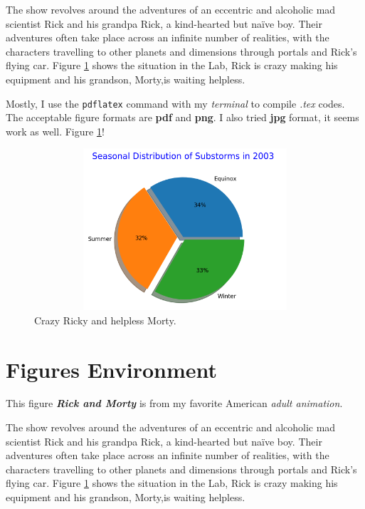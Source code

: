 \documentclass[12pt, letterpaper]{article} %
\begin{document}
The show revolves around the adventures of an eccentric and alcoholic mad scientist Rick and his grandpa Rick, 
a kind-hearted but naïve boy. Their adventures often take place across an infinite number of realities, with the 
characters travelling to other planets and dimensions through portals and Rick's flying car. Figure \ref{fig:rick} shows 
the situation in the Lab, Rick is crazy making his equipment and his grandson, Morty,is waiting helpless.

Mostly, I use the  {\tt pdflatex} command with my \textit{terminal} to compile \textit{.tex} codes. The acceptable figure 
formats are \textbf{pdf} and \textbf{png}. I also tried \textbf{jpg} format, it seems work as well. 
Figure \ref{fig:rick}! %
\begin{figure}[!t] %
\begin{center} %
  \includegraphics[width=12cm,height=6cm]{seasonal_distribution.png} %
  \caption{Crazy Ricky and helpless Morty.} %
  \label{fig:rick} %
\end{center} %
\end{figure} %


\section{Figures Environment} %
\graphicspath{ {./images/} } %
This figure \textit{\textbf{Rick and Morty }} is from my favorite American \textit{adult animation}.

The show revolves around the adventures of an eccentric and alcoholic mad scientist Rick and his grandpa Rick, 
a kind-hearted but naïve boy. Their adventures often take place across an infinite number of realities, with the 
characters travelling to other planets and dimensions through portals and Rick's flying car. Figure \ref{fig:rick} shows 
the situation in the Lab, Rick is crazy making his equipment and his grandson, Morty,is waiting helpless.
\end{document}
